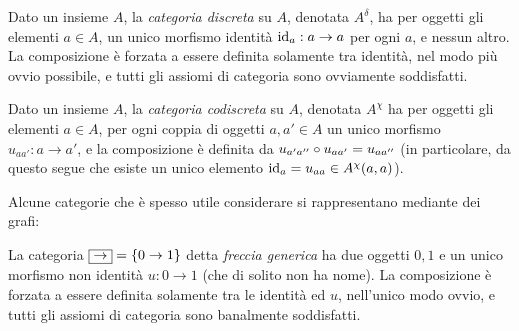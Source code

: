 \begin{example}\label{ex_cat_discreta}
	Dato un insieme \(A\), la \emph{categoria discreta} su \(A\), denotata \(A^\delta\), ha per oggetti gli elementi \(a\in A\), un unico morfismo identità \(\mathrm{id}_a : a\to a\) per ogni \(a\), e nessun altro. La composizione è forzata a essere definita solamente tra identità, nel modo più ovvio possibile, e tutti gli assiomi di categoria sono ovviamente soddisfatti.
\end{example}
\begin{example}\label{ex_cat_codiscreta}
	Dato un insieme \(A\), la \emph{categoria codiscreta} su \(A\), denotata \(A^\chi\) ha per oggetti gli elementi \(a\in A\), per ogni coppia di oggetti \(a,a'\in A\) un unico morfismo \(u_{aa'}:a\to a'\), e la composizione è definita da \(u_{a'a''}\circ u_{aa'}=u_{aa''}\) (in particolare, da questo segue che esiste un unico elemento \(\mathrm{id}_a=u_{aa}\in A^\chi(a,a)\)).
\end{example}
Alcune categorie che è spesso utile considerare si rappresentano mediante dei grafi:
\begin{example}\label{ex_cat_freccia}
	La categoria \(\boxed{\to}=\{0\to 1\}\) detta \emph{freccia generica} ha due oggetti \(0,1\) e un unico morfismo non identità \(u : 0\to 1\) (che di solito non ha nome). La composizione è forzata a essere definita solamente tra le identità ed \(u\), nell'unico modo ovvio, e tutti gli assiomi di categoria sono banalmente soddisfatti.
\end{example}
